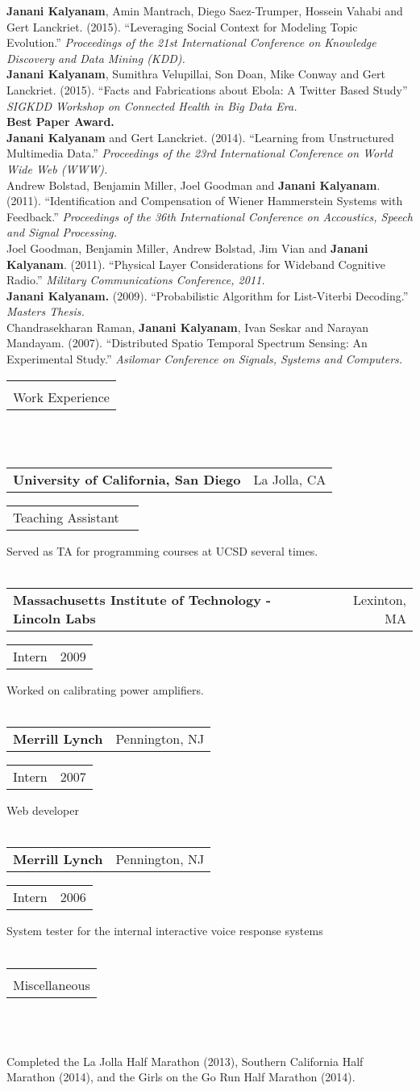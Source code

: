 \documentclass[11pt]{article}
\makeatletter
\newcommand{\secheader}[1]{

  {\begin{tabularx}{\textwidth}{@{}X}
    \midrule[0.095em] \\ \addlinespace[-1.2em]
    #1 \\
    \bottomrule[0.02em]
  \end{tabularx}\hfill\\\\}
}
\newcommand{\itemplaceheader}[2]{
  {\begin{tabular*}{\textwidth}{%
        @{\extracolsep{\fill}}%
        @{}l@{}%
        @{}r@{}}
      \textbf{#1} & {#2}
  \end{tabular*}}
}
\newcommand{\itempositionheader}[2]{
  {\setlength{\tabcolsep}{0em}
    \begin{tabular*}{\textwidth}{%
        @{\extracolsep{\fill}}
        @{}l@{}%
        @{}r@{}}
      \textrm{#1} & \textrm{#2}
  \end{tabular*}}
}
\makeatother
\begin{document}
\textbf{Janani Kalyanam}, Amin Mantrach, Diego Saez-Trumper, Hossein Vahabi and Gert Lanckriet. (2015). 
``Leveraging Social Context for Modeling Topic Evolution.''
\textit{Proceedings of the 21st International Conference on Knowledge Discovery and Data Mining (KDD).} \\

\textbf{Janani Kalyanam}, Sumithra Velupillai, Son Doan, Mike Conway and
Gert Lanckriet. (2015). ``Facts and Fabrications about Ebola:  A Twitter
Based Study'' \textit{SIGKDD Workshop on Connected Health in Big Data Era.} \\
\textbf{Best Paper Award.}\\

\textbf{Janani Kalyanam} and Gert Lanckriet.
(2014). ``Learning from Unstructured Multimedia Data.'' \textit{Proceedings of the
23rd International Conference on World Wide Web (WWW).} \\

Andrew Bolstad, Benjamin Miller, Joel Goodman and \textbf{Janani Kalyanam}. (2011). 
``Identification and Compensation of Wiener Hammerstein Systems with Feedback.'' 
\textit{Proceedings of the 36th International Conference on Accoustics, Speech and
Signal Processing.} \\

Joel Goodman, Benjamin Miller, Andrew Bolstad, Jim Vian and \textbf{Janani Kalyanam}. (2011). 
``Physical Layer Considerations for Wideband Cognitive Radio.''
\textit{Military Communications Conference, 2011.} \\

\textbf{Janani Kalyanam.}  (2009).
``Probabilistic Algorithm for List-Viterbi Decoding.''
\textit{Masters Thesis.} \\

Chandrasekharan Raman, \textbf{Janani Kalyanam}, Ivan Seskar and Narayan Mandayam.  (2007).
``Distributed Spatio Temporal Spectrum Sensing:  An Experimental Study.''
\textit{Asilomar Conference on Signals, Systems and Computers.} \\
\secheader{Work Experience}
\itemplaceheader{University of California, San Diego}{La Jolla, CA}
\itempositionheader{Teaching Assistant}{}
Served as TA for programming courses at UCSD several times.\\ 
\hfill \\
\itemplaceheader{Massachusetts Institute of Technology - Lincoln Labs}{Lexinton, MA}
\itempositionheader{Intern}{2009}
Worked on calibrating power amplifiers. \\ 
\hfill \\
\itemplaceheader{Merrill Lynch}{Pennington, NJ}
\itempositionheader{Intern}{2007}
Web developer \\
\hfill \\
\itemplaceheader{Merrill Lynch}{Pennington, NJ}
\itempositionheader{Intern}{2006}
System tester for the internal interactive voice response systems \\
\hfill \\

\secheader{Miscellaneous}
Completed the La Jolla Half Marathon (2013), Southern California Half Marathon (2014), and
the Girls on the Go Run Half Marathon (2014).
\end{document}
